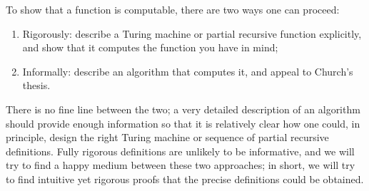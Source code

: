 \documentclass[../../include/open-logic-section]{subfiles}
\begin{document}
To show that a function is computable, there are
two ways one can proceed:
\begin{enumerate}
\item Rigorously: describe a Turing machine or partial recursive
  function explicitly, and show that it computes the function you have
  in mind;
\item Informally: describe an algorithm that computes it, and appeal to
  Church's thesis.
\end{enumerate}
There is no fine line between the two; a very detailed description of
an algorithm should provide enough information so that it is
relatively clear how one could, in principle, design the right Turing
machine or sequence of partial recursive definitions. Fully rigorous
definitions are unlikely to be informative, and we will try to find a
happy medium between these two approaches; in short, we will try to
find intuitive yet rigorous proofs that the precise definitions could
be obtained.
\end{document}
